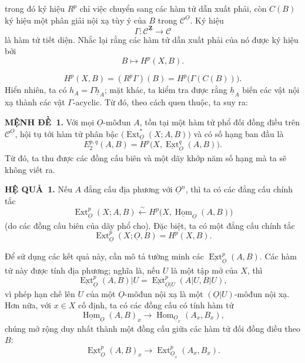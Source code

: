 \documentclass[11pt,twoside,openany]{book}
\numberwithin{equation}{section}
\newcommand{\src}[1]{%
  \phantomsection\hypertarget{src:\fgasourceid:#1}{}%
  \marginpar{\raggedleft\footnotesize\sffamily #1}%
}
\newcommand{\fgasourceid}{unset}
\newcommand{\Osh}{\underline{O}}
\newcommand{\Zsh}{\underline{\mathbf Z}}
\newcommand{\Ccat}{\mathcal C}
\newcommand{\Homsh}{\underline{\operatorname{Hom}}}
\newcommand{\Extsh}{\underline{\operatorname{Ext}}}
\newcommand{\hsh}{\underline{h}}
\newcommand{\fquote}[1]{\textquotedbl#1\textquotedbl}
\newcommand{\result}[2]{\par\medskip\noindent\textbf{#1\if\relax\detokenize{#2}\relax\else\ #2\fi.}\quad}
\begin{document}
trong đó ký hiệu $R^{p}$ chỉ việc chuyển sang các hàm tử dẫn xuất phải, còn
$C(B)$ ký hiệu một phân giải nội xạ tùy ý của $B$ trong $\Ccat^{\Osh}$.
Ký hiệu
\[
  \Gamma:\Ccat^{\Zsh}\longrightarrow\Ccat
\]
là hàm tử \fquote{tiết diện}. Nhắc lại rằng các hàm tử dẫn xuất phải của nó được
ký hiệu bởi
\[
  B\longmapsto H^{p}(X,B).
\]

\src{170}
\begin{equation}\tag{1.3}
  H^{p}(X,B)=(R^{p}\Gamma)(B)=H^{p}\bigl(\Gamma(C(B))\bigr).
\end{equation}
Hiển nhiên, ta có $h_A=\Gamma\hsh_A$; mặt khác, ta kiểm tra được rằng $\hsh_A$
biến các vật nội xạ thành các vật $\Gamma$-acyclic. Từ đó, theo cách quen thuộc,
ta suy ra:

\result{MỆNH ĐỀ}{1} Với mọi $\Osh$-môđun $A$, tồn tại một hàm tử
phổ đối đồng điều trên $\Ccat^{\Osh}$, hội tụ tới hàm tử phân bậc
$\bigl(\operatorname{Ext}_{\Osh}^{*}(X;A,B)\bigr)$ và có số hạng ban đầu là
\begin{equation}\tag{1.4}
  E_{2}^{p,q}(A,B)=H^{p}\bigl(X,\Extsh_{\Osh}^{q}(A,B)\bigr).
\end{equation}
Từ đó, ta thu được các \fquote{đồng cấu biên} và một dãy khớp năm số hạng
mà ta sẽ không viết ra.

\result{HỆ QUẢ}{1} Nếu $A$ đẳng cấu địa phương với $\Osh^{n}$, thì ta có
các đẳng cấu chính tắc
\begin{equation}\tag{1.5}
  \operatorname{Ext}_{\Osh}^{p}(X;A,B)
  \overset{\sim}{\longleftarrow}
  H^{p}\bigl(X,\Homsh_{\Osh}(A,B)\bigr)
\end{equation}
(do các đồng cấu biên của dãy phổ cho). Đặc biệt, ta có
một đẳng cấu chính tắc
\begin{equation}\tag{1.6}
  \operatorname{Ext}_{\Osh}^{p}(X;\Osh,B)=H^{p}(X,B).
\end{equation}

Để sử dụng các kết quả này, cần mô tả tường minh các
$\Extsh_{\Osh}^{p}(A,B)$. Các hàm tử này được tính địa phương;
nghĩa là, nếu $U$ là một tập mở của $X$, thì
\[
  \Extsh_{\Osh}^{p}(A,B)|U
  =\Extsh_{\Osh|U}^{p}(A|U,B|U),
\]
vì phép hạn chế lên $U$ của một $\Osh$-môđun nội xạ
là một $(\Osh|U)$-môđun nội xạ. Hơn nữa, với $x\in X$ cố định, ta có các đồng cấu có tính hàm tử
\begin{equation}\tag{1.7}
  \Homsh_{\Osh}(A,B)_x
  \longrightarrow
  \operatorname{Hom}_{\Osh_x}(A_x,B_x),
\end{equation}
chúng mở rộng duy nhất thành một đồng cấu giữa các hàm tử đối đồng điều
theo $B$:
\begin{equation}\tag{1.8}
  \Extsh_{\Osh}^{p}(A,B)_x
  \longrightarrow
  \operatorname{Ext}_{\Osh_x}^{p}(A_x,B_x).
\end{equation}
\end{document}
